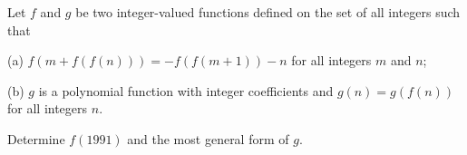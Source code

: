 Let $f$ and $g$ be two integer-valued functions defined on the set of all integers such that

(a) $f(m + f(f(n))) = -f(f(m+1)) - n$ for all integers $m$ and $n$;

(b) $g$ is a polynomial function with integer coefficients and $g(n) = g(f(n))$ for all integers $n$.

Determine $f(1991)$ and the most general form of $g$.
